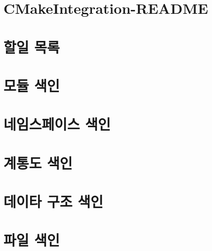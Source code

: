 \documentclass[twoside]{book}
\newcommand{\+}{\discretionary{\mbox{\scriptsize$\hookleftarrow$}}{}{}}
\begin{document}
\chapter{C\+Make\+Integration-\/\+R\+E\+A\+D\+ME}
\label{md_thirdparty_cpputest_src_CppUTest_CMakeIntegration-README}
\hypertarget{md_thirdparty_cpputest_src_CppUTest_CMakeIntegration-README}{}

\chapter{할일 목록}
\label{todo}
\hypertarget{todo}{}

\chapter{모듈 색인}

\chapter{네임스페이스 색인}

\chapter{계통도 색인}

\chapter{데이타 구조 색인}

\chapter{파일 색인}

\end{document}
